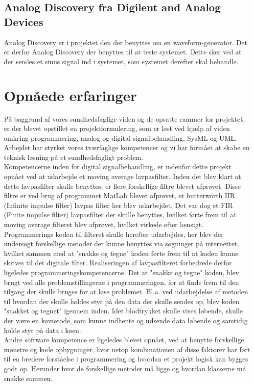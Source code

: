 \subsection{Analog Discovery fra Digilent and Analog Devices}
Analog Discovery er i projektet den der benyttes om en waveform-generator. Det er derfor Analog Discovery der benyttes til at teste systemet. Dette sker ved at der sendes et sinus signal ind i systemet, som systemet derefter skal behandle.
\section{Opnåede erfaringer}
På baggrund af vores sundhedsfaglige viden og de opsatte rammer for projektet, er der blevet opstillet en projektformulering, som er løst ved hjælp af viden omkring programmering, analog og digital signalbehandling, SysML og UML. Arbejdet har styrket vores tværfaglige kompetencer og vi har formået at skabe en teknisk løsning på et sundhedsfagligt problem.\\
Kompetencerne inden for digital signalbehandling, er indenfor dette projekt opnået ved at udarbejde et moving average lavpasfilter. Inden det blev klart at dette lavpasfilter skulle benyttes, er flere forskellige filtre blevet afprøvet. Disse filtre er ved brug af programmet MatLab blevet afprøvet, et butterworth IIR (Infinite impulse filter) lavpas filter her blev udarbejdet. Det var dog et FIR (Finite impulse filter) lavpasfilter der skulle benyttes, hvilket førte frem til at moving average filteret blev afprøvet, hvilket virkede efter hensigt. \\
Programmerings koden til filteret skulle herefter udarbejdes, her blev der undersøgt forskellige metoder der kunne benyttes via søgninger på internettet, hvilket sammen med at "snakke og tegne" koden førte frem til at koden kunne skrives til det digitale filter. Realiseringen af lavpasfilteret forbedrede derfor ligeledes programmeringskompetencerne. Det at "snakke og tegne" koden, blev brugt ved alle problemstillingerne i programmeringen, for at finde frem til den tilgang der skulle bruges for at løse problemet. Bl.a. ved udarbejdelse af metoden til hvordan der skulle holdes styr på den data der skulle sendes op, blev koden "snakket og tegnet" igennem inden. Idet blodtrykket skulle vises løbende, skulle der være en kømetode, som kunne indhente og udsende data løbende og samtidig holde styr på data i køen.\\
Andre software kompetence er ligeledes blevet opnået, ved at benytte forskellige mønstre og kode opbygninger, hvor netop kombinationen af disse faktorer har ført til en bredere forståelse i programmering og hvordan et projekt logisk kan bygges godt op. Herunder hvor de forskellige metoder må ligge og hvordan klasserne må snakke sammen. \\\\
